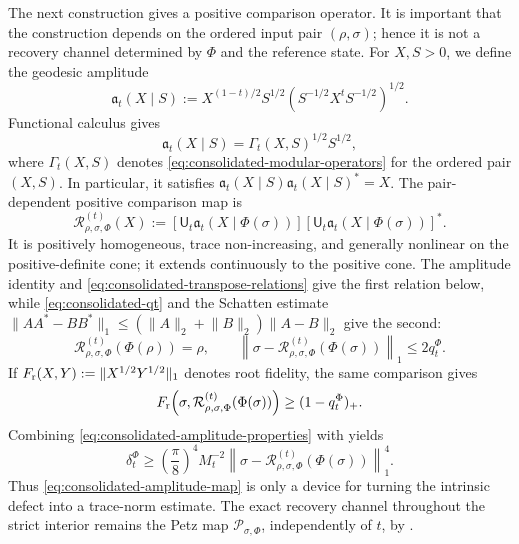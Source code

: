 \documentclass[11pt]{article}
\theoremstyle{remark}
\newcommand{\1}{\mathbbm{1}}
\begin{document}
The next construction gives a positive comparison operator.  It is
important that the construction depends on the ordered input pair
$(\rho,\sigma)$; hence it is not a recovery channel determined by
$\Phi$ and the reference state.  For $X,S>0$, we define the geodesic
amplitude
\begin{equation}
 \mathfrak a_t(X\mid S)
 :=X^{(1-t)/2}S^{1/2}
 \left(S^{-1/2}X^tS^{-1/2}\right)^{1/2}.
 \label{eq:consolidated-amplitude}
\end{equation}
Functional calculus gives
\begin{equation}
 \mathfrak a_t(X\mid S)=\Gamma_t(X,S)^{1/2}S^{1/2},
\end{equation}
where $\Gamma_t(X,S)$ denotes \eqref{eq:consolidated-modular-operators}
for the ordered pair $(X,S)$.  In particular, it satisfies
$\mathfrak a_t(X\mid S)\mathfrak a_t(X\mid S)^*=X$.
The pair-dependent positive comparison map is
\begin{equation}
 \mathcal R_{\rho,\sigma,\Phi}^{(t)}(X)
 :=[\mathsf U_t\mathfrak a_t(X\mid\Phi(\sigma))]
   [\mathsf U_t\mathfrak a_t(X\mid\Phi(\sigma))]^*.
 \label{eq:consolidated-amplitude-map}
\end{equation}
It is positively homogeneous, trace non-increasing, and generally
nonlinear on the positive-definite cone; it extends continuously to
the positive cone.  The amplitude identity and
\eqref{eq:consolidated-transpose-relations} give the first relation
below, while \eqref{eq:consolidated-qt} and the Schatten estimate
$\lVert AA^*-BB^*\rVert_1\leq
(\lVert A\rVert_2+\lVert B\rVert_2)\lVert A-B\rVert_2$ give the
second:
\begin{equation}
 \mathcal R_{\rho,\sigma,\Phi}^{(t)}(\Phi(\rho))=\rho,
 \qquad
 \left\lVert\sigma-
 \mathcal R_{\rho,\sigma,\Phi}^{(t)}(\Phi(\sigma))\right\rVert_1
 \leq2q_t^\Phi.
 \label{eq:consolidated-amplitude-properties}
\end{equation}
If
$F_{\rm r}(X,Y):=\lVert X^{1/2}Y^{1/2}\rVert_1$ denotes root
fidelity, the same comparison gives
\begin{equation}
 F_{\rm r}\!\left(\sigma,
 \mathcal R_{\rho,\sigma,\Phi}^{(t)}(\Phi(\sigma))\right)
 \geq(1-q_t^\Phi)_+.
 \label{eq:consolidated-amplitude-fidelity}
\end{equation}
Combining \eqref{eq:consolidated-amplitude-properties} with
 yields
\begin{equation}
 \delta_t^\Phi
 \geq\left(\frac\pi8\right)^4M_t^{-2}
 \left\lVert\sigma-
 \mathcal R_{\rho,\sigma,\Phi}^{(t)}(\Phi(\sigma))
 \right\rVert_1^4.
 \label{eq:consolidated-amplitude-trace-bound}
\end{equation}
Thus \eqref{eq:consolidated-amplitude-map} is only a device for
turning the intrinsic defect into a trace-norm estimate.  The exact
recovery channel throughout the strict interior remains the Petz map
$\mathcal P_{\sigma,\Phi}$, independently of $t$, by
.
\end{document}
